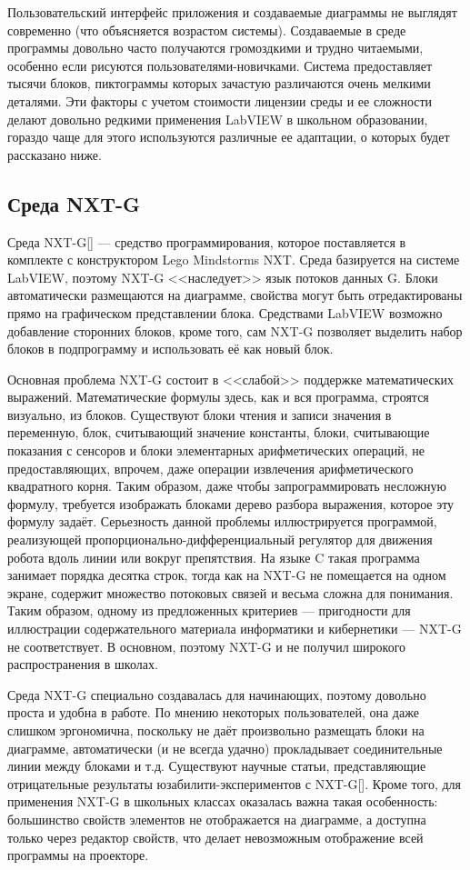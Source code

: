 \documentclass[a5paper]{article}
\begin{document}
Пользовательский интерфейс приложения и создаваемые диаграммы не выглядят современно (что объясняется возрастом 
системы). Создаваемые в среде программы довольно часто получаются громоздкими и трудно читаемыми, особенно 
если рисуются пользователями-новичками. Система предоставляет тысячи блоков, пиктограммы которых зачастую 
различаются очень мелкими деталями. Эти факторы с учетом стоимости лицензии среды и ее сложности делают 
довольно редкими применения LabVIEW в школьном образовании, гораздо чаще для этого используются различные 
ее адаптации, о которых будет рассказано ниже.

\subsection{Среда NXT-G}

Среда NXT-G[] --- средство программирования, которое поставляется в комплекте с конструктором Lego Mindstorms 
NXT. Среда базируется на системе LabVIEW, поэтому NXT-G <<наследует>> язык потоков данных G. Блоки автоматически 
размещаются на диаграмме, свойства могут быть отредактированы прямо на графическом представлении блока. 
Средствами LabVIEW возможно добавление сторонних блоков, кроме того, сам NXT-G позволяет выделить набор 
блоков в подпрограмму и использовать её как новый блок.

Основная проблема NXT-G состоит в <<слабой>> поддержке математических выражений. Математические формулы 
здесь, как и вся программа, строятся визуально, из блоков. Существуют блоки чтения и записи значения в 
переменную, блок, считывающий значение константы, блоки, считывающие показания с сенсоров и блоки элементарных 
арифметических операций, не предоставляющих, впрочем, даже операции извлечения арифметического квадратного корня. 
Таким образом, даже чтобы запрограммировать несложную формулу, требуется изображать блоками дерево разбора выражения, 
которое эту формулу задаёт. Серьезность данной проблемы иллюстрируется программой, реализующей 
пропорционально-дифференциальный регулятор для движения робота вдоль линии или вокруг препятствия. На языке C 
такая программа занимает порядка десятка строк, тогда как на NXT-G не помещается на одном экране, содержит 
множество потоковых связей и весьма сложна для понимания. Таким образом, одному из предложенных критериев --- 
пригодности для иллюстрации содержательного материала информатики и кибернетики --- NXT-G не соответствует. 
В основном, поэтому NXT-G и не получил широкого распространения в школах.

Среда NXT-G специально создавалась для начинающих, поэтому довольно проста и удобна в работе. По мнению 
некоторых пользователей, она даже слишком эргономична, поскольку не даёт произвольно размещать блоки на диаграмме, 
автоматически (и не всегда удачно) прокладывает соединительные линии между блоками и т.д. Существуют научные статьи, 
представляющие отрицательные результаты юзабилити-экспериментов с NXT-G[]. Кроме того, для применения NXT-G 
в школьных классах оказалась важна такая особенность: большинство свойств элементов не отображается на диаграмме, 
а доступна только через редактор свойств, что делает невозможным отображение всей программы на проекторе. 
\end{document}
